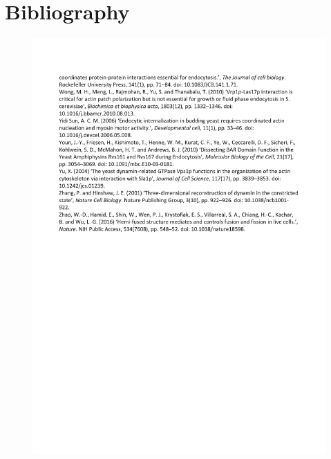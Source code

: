 \chapter*{Bibliography} %
\chaptermark{}

\begin{figure}[H]
\includegraphics[scale=1.5]{parts/bib_end}
\end{figure}